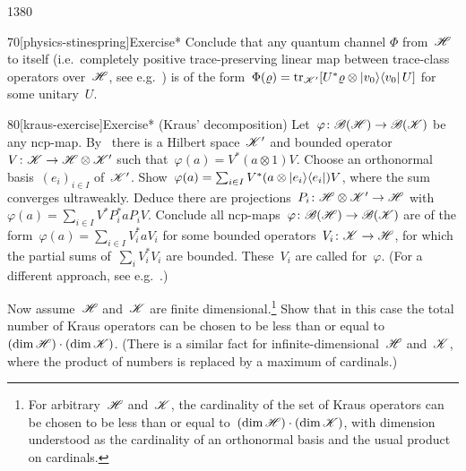 \begin{parsec}{1380}
\begin{point}{70}[physics-stinespring]{Exercise*}
    Conclude that any quantum channel
        $\Phi$ from~$\mathscr{H}$ to itself
        (i.e.~completely positive trace-preserving
            linear map between trace-class operators over~$\mathscr{H}$,
            see e.g.~\cite[\S2.6.2]{tomamichel})
        is of the
        form~$\Phi(\varrho) = \mathop{\mathrm{tr}}_{\mathscr{K}'}
            [U^* \varrho \otimes \left|v_0\right>\!\left<v_0\right| U]$
            for some unitary~$U$.
\end{point}
\begin{point}{80}[kraus-exercise]{Exercise* (Kraus' decomposition)}%
Let~$\varphi \colon \mathscr{B}(\mathscr{H}) \to \mathscr{B}(\mathscr{K})$
    be any ncp-map.
By~
    there is a Hilbert space~$\mathscr{K}'$
    and bounded operator~$V\colon \mathscr{K} \to \mathscr{H} \otimes \mathscr{K}'$
    such that~$\varphi(a) = V^* (a \otimes 1) V$.
Choose an orthonormal basis~$(e_i)_{i \in I}$ of~$\mathscr{K}'$.
Show~$\varphi(a) = \sum_{i \in I} V^* (a \otimes \left|e_i\right>\!\left<e_i\right|) V$,
where the sum converges ultraweakly.
Deduce there are projections~$P_i \colon \mathscr{H} \otimes \mathscr{K}' \to \mathscr{H}$
with~$\varphi(a) = \sum_{i \in I} V^*P_i^* a P_iV$.
Conclude all ncp-maps~$\varphi\colon \mathscr{B}(\mathscr{H}) \to \mathscr{B}(\mathscr{K})$
are of the form~$\varphi(a) = \sum_{i \in I} V_i^* a V_i$
for some bounded operators~$V_i\colon \mathscr{K} \to \mathscr{H}$,
for which the partial sums of~$\sum_i V_i^*V_i$ are bounded.
These~$V_i$ are called 
    for~$\varphi$.  (For a different approach,
    see e.g.~\cite[thm.~2.3]{davies1976quantum}.)

Now assume~$\mathscr{H}$ and~$\mathscr{K}$ are finite dimensional.\footnote{%
        For arbitrary~$\mathscr{H}$ and~$\mathscr{K}$,
            the cardinality of the set of Kraus operators
            can be chosen to be less than or equal
            to~$(\dim \mathscr{H}) \cdot (\dim \mathscr{K})$,
            with dimension understood as the cardinality of
                an orthonormal basis and the usual product on cardinals.}
Show that in this case
    the total number of Kraus operators can be chosen
    to be less than or equal to~$(\dim \mathscr{H}) \cdot (\dim \mathscr{K})$.
    (There is a similar fact for infinite-dimensional~$\mathscr{H}$ and~$\mathscr{K}$,
        where the product of numbers is replaced by a maximum of cardinals.)
\end{point}
\end{parsec}

